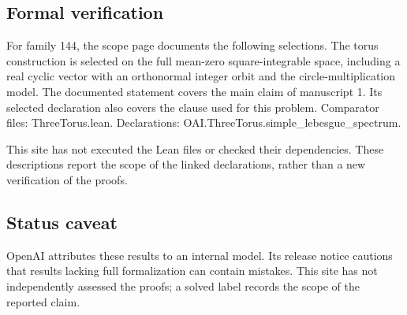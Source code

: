 \documentclass[11pt]{article}
\begin{document}
\subsection{Formal verification}
For family 144, the scope page documents the following selections. The torus construction is selected on the full mean-zero square-integrable space, including a real cyclic vector with an orthonormal integer orbit and the circle-multiplication model. The documented statement covers the main claim of manuscript 1. Its selected declaration also covers the clause used for this problem. Comparator files: ThreeTorus.lean. Declarations: OAI.ThreeTorus.simple\_lebesgue\_spectrum.

This site has not executed the Lean files or checked their dependencies. These descriptions report the scope of the linked declarations, rather than a new verification of the proofs.

\subsection{Status caveat}
OpenAI attributes these results to an internal model. Its release notice cautions that results lacking full formalization can contain mistakes. This site has not independently assessed the proofs; a solved label records the scope of the reported claim.
\end{document}
